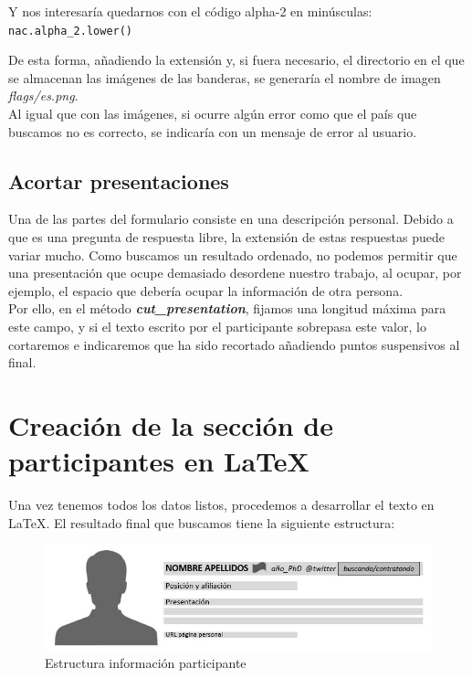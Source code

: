 \documentclass[a4paper, 12pt]{book}
\begin{document}
Y nos interesaría quedarnos con el código alpha-2 en minúsculas:\\
\verb"nac.alpha_2.lower()"

De esta forma, añadiendo la extensión y, si fuera necesario, el directorio en el que se almacenan las imágenes de las banderas, se generaría el nombre de imagen \textit{flags/es.png}.\\

Al igual que con las imágenes, si ocurre algún error como que el país que buscamos no es correcto, se indicaría con un mensaje de error al usuario.

\subsection{Acortar presentaciones}
\label{subsec:presentacion}
Una de las partes del formulario consiste en una descripción personal. Debido a que es una pregunta de respuesta libre, la extensión de estas respuestas puede variar mucho. Como buscamos un resultado ordenado, no podemos permitir que una presentación que ocupe demasiado desordene nuestro trabajo, al ocupar, por ejemplo, el espacio que debería ocupar la información de otra persona.\\

Por ello, en el método \textbf{\textit{cut\_presentation}}, fijamos una longitud máxima para este campo, y si el texto escrito por el participante sobrepasa este valor, lo cortaremos e indicaremos que ha sido recortado añadiendo puntos suspensivos al final.


\section{Creación de la sección de participantes en \LaTeX}
\label{sec:creaParticipantes}
Una vez tenemos todos los datos listos, procedemos a desarrollar el texto en \LaTeX. El resultado final que buscamos tiene la siguiente estructura:
\begin{figure}[h!]
	\centering
	\includegraphics[width=15cm, keepaspectratio]{img/esquemaLatex}
	\caption{Estructura información participante}
	\label{fig:ejemploLatex}
\end{figure}
\end{document}

